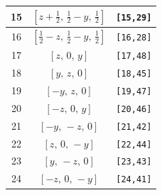 \documentclass[fleqn,8pt]{jsarticle}
\begin{document}
\begin{longtable}{ccc}
15 & $\left[ z + \frac{1}{2},\, \frac{1}{2} - y,\, \frac{1}{2} \right]$ & {\tt [15,29]} \\ \hline
16 & $\left[ \frac{1}{2} - z,\, \frac{1}{2} - y,\, \frac{1}{2} \right]$ & {\tt [16,28]} \\ \hline
17 & $\left[ z,\, 0,\, y \right]$ & {\tt [17,48]} \\ \hline
18 & $\left[ y,\, z,\, 0 \right]$ & {\tt [18,45]} \\ \hline
19 & $\left[ - y,\, z,\, 0 \right]$ & {\tt [19,47]} \\ \hline
20 & $\left[ - z,\, 0,\, y \right]$ & {\tt [20,46]} \\ \hline
21 & $\left[ - y,\, - z,\, 0 \right]$ & {\tt [21,42]} \\ \hline
22 & $\left[ z,\, 0,\, - y \right]$ & {\tt [22,44]} \\ \hline
23 & $\left[ y,\, - z,\, 0 \right]$ & {\tt [23,43]} \\ \hline
24 & $\left[ - z,\, 0,\, - y \right]$ & {\tt [24,41]} \\
\end{longtable}
\renewcommand{\arraystretch}{1.2}
\end{document}
